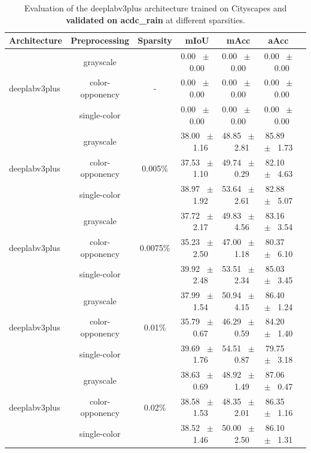 \begin{table}[h]
  \centering
  \caption{Evaluation of the deeplabv3plus architecture trained on Cityscapes and \textbf{validated on acdc_rain} at different sparsities.}
  \begin{tabular}{@{}lccc ccc@{}}
    \toprule
    Architecture & Preprocessing & Sparsity & mIoU & mAcc & aAcc \\
    \midrule
    \midrule
    \midrule
    \multirow{3}{*}{deeplabv3plus} & grayscale & \multirow{3}{*}{-} & 0.00 ~$\pm$~ 0.00 & 0.00 ~$\pm$~ 0.00 & 0.00 ~$\pm$~ 0.00 \\
    & color-opponency & & 0.00 ~$\pm$~ 0.00 & 0.00 ~$\pm$~ 0.00 & 0.00 ~$\pm$~ 0.00 \\
    & single-color & & 0.00 ~$\pm$~ 0.00 & 0.00 ~$\pm$~ 0.00 & 0.00 ~$\pm$~ 0.00 \\
    \midrule
    \multirow{3}{*}{deeplabv3plus} & grayscale & \multirow{3}{*}{0.005\%} & 38.00 ~$\pm$~ 1.16 & 48.85 ~$\pm$~ 2.81 & 85.89 ~$\pm$~ 1.73 \\
    & color-opponency & & 37.53 ~$\pm$~ 1.10 & 49.74 ~$\pm$~ 0.29 & 82.10 ~$\pm$~ 4.63 \\
    & single-color & & 38.97 ~$\pm$~ 1.92 & 53.64 ~$\pm$~ 2.61 & 82.88 ~$\pm$~ 5.07 \\
    \midrule
    \multirow{3}{*}{deeplabv3plus} & grayscale & \multirow{3}{*}{0.0075\%} & 37.72 ~$\pm$~ 2.17 & 49.83 ~$\pm$~ 4.56 & 83.16 ~$\pm$~ 3.54 \\
    & color-opponency & & 35.23 ~$\pm$~ 2.50 & 47.00 ~$\pm$~ 1.18 & 80.37 ~$\pm$~ 6.10 \\
    & single-color & & 39.92 ~$\pm$~ 2.48 & 53.51 ~$\pm$~ 2.34 & 85.03 ~$\pm$~ 3.45 \\
    \midrule
    \multirow{3}{*}{deeplabv3plus} & grayscale & \multirow{3}{*}{0.01\%} & 37.99 ~$\pm$~ 1.54 & 50.94 ~$\pm$~ 4.15 & 86.40 ~$\pm$~ 1.24 \\
    & color-opponency & & 35.79 ~$\pm$~ 0.67 & 46.29 ~$\pm$~ 0.59 & 84.20 ~$\pm$~ 1.40 \\
    & single-color & & 39.69 ~$\pm$~ 1.76 & 54.51 ~$\pm$~ 0.87 & 79.75 ~$\pm$~ 3.18 \\
    \midrule
    \multirow{3}{*}{deeplabv3plus} & grayscale & \multirow{3}{*}{0.02\%} & 38.63 ~$\pm$~ 0.69 & 48.92 ~$\pm$~ 1.49 & 87.06 ~$\pm$~ 0.47 \\
    & color-opponency & & 38.58 ~$\pm$~ 1.53 & 48.35 ~$\pm$~ 2.01 & 86.35 ~$\pm$~ 1.16 \\
    & single-color & & 38.52 ~$\pm$~ 1.46 & 50.00 ~$\pm$~ 2.50 & 86.10 ~$\pm$~ 1.31 \\
    \midrule
    \bottomrule
  \end{tabular}
  \label{tab:sparse_deeplabv3plus_acdc_rain}
\end{table}